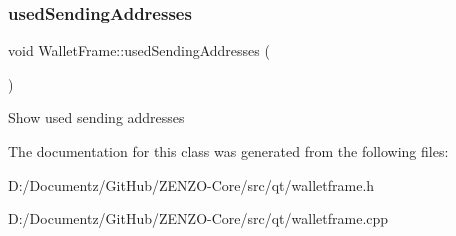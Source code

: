 \subsubsection{\texorpdfstring{usedSendingAddresses}{usedSendingAddresses}}
{\footnotesize\ttfamily void Wallet\+Frame\+::used\+Sending\+Addresses (\begin{DoxyParamCaption}{ }\end{DoxyParamCaption})\hspace{0.3cm}{\ttfamily [slot]}}

Show used sending addresses 

The documentation for this class was generated from the following files\+:\begin{DoxyCompactItemize}
\item 
D\+:/\+Documentz/\+Git\+Hub/\+Z\+E\+N\+Z\+O-\/\+Core/src/qt/walletframe.\+h\item 
D\+:/\+Documentz/\+Git\+Hub/\+Z\+E\+N\+Z\+O-\/\+Core/src/qt/walletframe.\+cpp\end{DoxyCompactItemize}
